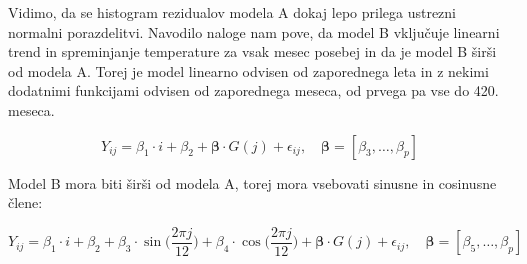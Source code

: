 \documentclass[12pt, a4paper]{article}
\begin{document}
\begin{figure}[h]
\end{figure}

Vidimo, da se histogram rezidualov modela A dokaj lepo prilega ustrezni 
normalni porazdelitvi.
Navodilo naloge nam pove, da model B vključuje linearni trend in spreminjanje 
temperature za vsak mesec posebej in da je model B širši od modela A. Torej je 
model linearno odvisen od zaporednega leta in z nekimi dodatnimi funkcijami 
odvisen od zaporednega meseca, od prvega pa vse do 420. meseca. 

$$ Y_{ij} = \beta_1 \cdot i + \beta_2 + \boldsymbol{\beta} \cdot G(j) + 
\epsilon_{ij}, \quad \boldsymbol{\beta} = [\beta_3, \ldots, \beta_p]
$$

Model B mora biti širši od modela A, torej mora vsebovati sinusne in cosinusne 
člene:

$$ Y_{ij} = \beta_1 \cdot i + \beta_2 + \beta_3 \cdot \sin \Big(\frac{2\pi j}{12}\Big)
+ \beta_4 \cdot \cos \Big(\frac{2\pi j}{12}\Big) + \boldsymbol{\beta} \cdot G(j) + 
\epsilon_{ij}, \quad \boldsymbol{\beta} = [\beta_5, \ldots, \beta_p]
$$
\end{document}
